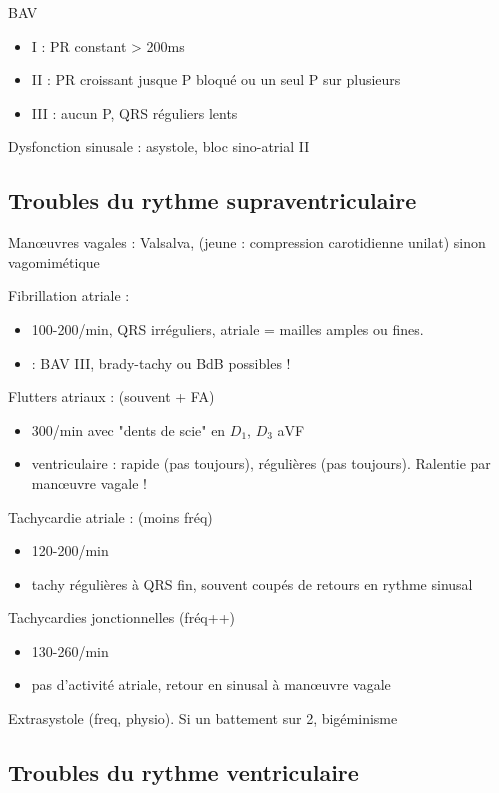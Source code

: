 \documentclass{article}
\begin{document}
BAV
\begin{itemize}
  \item I : PR constant > 200ms
  \item II : PR croissant jusque P bloqué ou un seul P sur plusieurs
  \item III : aucun P, QRS réguliers lents
\end{itemize}

Dysfonction sinusale : asystole, bloc sino-atrial II

\subsection{Troubles du rythme supraventriculaire}
Man\oe{}uvres vagales : Valsalva, (jeune : compression carotidienne unilat) sinon
vagomimétique

Fibrillation atriale : 
\begin{itemize}
  \item 100-200/min, QRS irréguliers, atriale = mailles amples ou fines.
  \item \danger{} : BAV III, brady-tachy ou BdB possibles !
\end{itemize}
Flutters atriaux : (souvent + FA)
\begin{itemize}
  \item 300/min avec "dents de scie" en $D_1$, $D_3$ aVF
  \item ventriculaire : rapide (pas toujours), régulières (pas toujours).
    Ralentie par man\oe{}uvre vagale !
\end{itemize}
Tachycardie atriale : (moins fréq)
\begin{itemize}
  \item 120-200/min
  \item tachy régulières à QRS fin, souvent coupés de retours en rythme sinusal
\end{itemize}
Tachycardies jonctionnelles (fréq++)
\begin{itemize}
  \item 130-260/min
  \item pas d'activité atriale, retour en sinusal à man\oe{}uvre vagale
\end{itemize}
Extrasystole (freq, physio). Si un battement sur 2, bigéminisme

\subsection{Troubles du rythme ventriculaire}
\end{document}
